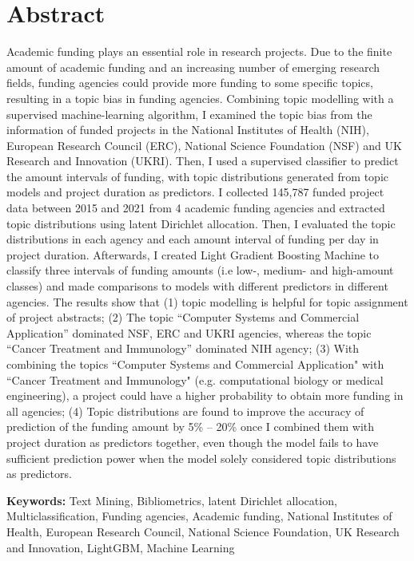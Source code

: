 \section*{Abstract}

Academic funding plays an essential role in research projects. Due to the finite amount of academic funding and an increasing number of emerging research fields, funding agencies could provide more funding to some specific topics, resulting in a topic bias in funding agencies. Combining topic modelling with a supervised machine-learning algorithm, I examined the topic bias from the information of funded projects in the National Institutes of Health (NIH), European Research Council (ERC), National Science Foundation (NSF) and UK Research and Innovation (UKRI). Then, I used a supervised classifier to predict the amount intervals of funding, with topic distributions generated from topic models and project duration as predictors. I collected 145,787 funded project data between 2015 and 2021 from 4 academic funding agencies and extracted topic distributions using latent Dirichlet allocation. Then, I evaluated the topic distributions in each agency and each amount interval of funding per day in project duration. Afterwards, I created Light Gradient Boosting Machine to classify three intervals of funding amounts (i.e low-, medium- and high-amount classes) and made comparisons to models with different predictors in different agencies. The results show that (1) topic modelling is helpful for topic assignment of project abstracts; (2) The topic “Computer Systems and Commercial Application” dominated NSF, ERC and UKRI agencies, whereas the topic “Cancer Treatment and Immunology” dominated NIH agency; (3) With combining the topics ``Computer Systems and Commercial Application" with ``Cancer Treatment and Immunology" (e.g. computational biology or medical engineering), a project could have a higher probability to obtain more funding in all agencies; (4) Topic distributions are found to improve the accuracy of prediction of the funding amount by 5\% -- 20\% once I combined them with project duration as predictors together, even though the model fails to have sufficient prediction power when the model solely considered topic distributions as predictors.

\textbf{Keywords: } Text Mining, Bibliometrics, latent Dirichlet allocation, Multiclassification, Funding agencies, Academic funding, National Institutes of Health, European Research Council, National Science Foundation, UK Research and Innovation, LightGBM, Machine Learning
